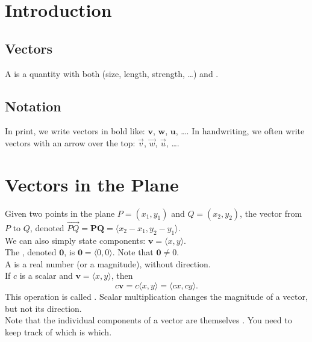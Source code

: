 \section{Introduction}

\subsection{Vectors}

A  is a quantity with both  (size, length, strength, \dots) and .  

\subsection{Notation}

In print, we write vectors in bold like: $\mathbf{v}$, $\mathbf{w}$, $\mathbf{u}$, \dots.  In handwriting, we often write vectors with an arrow over the top: $\vec{v}$, $\vec{w}$, $\vec{u}$, \dots.

\section{Vectors in the Plane}

Given two points in the plane \(P = (x_{1},y_{1})\) and \(Q = (x_{2},y_{2})\), the vector from \(P\) to \(Q\), denoted \(\overrightarrow{PQ} = \mathbf{PQ} = \langle x_{2}-x_{1},y_{2}-y_{1}\rangle\). \\

We can also simply state components: \(\mathbf{v} = \langle x, y\rangle\). \\

The , denoted \(\mathbf{0}\), is \(\mathbf{0} = \langle 0,0 \rangle\). Note that \(\mathbf{0} \ne 0\). \\

A  is a real number (or a magnitude), without direction. \\

If \(c\) is a scalar and \(\mathbf{v} = \langle x,y\rangle\), then
\[
    c\mathbf{v} = c\langle x,y\rangle = \langle cx,cy\rangle.
\]
This operation is called . Scalar multiplication changes the magnitude of a vector, but not its direction. \\

Note that the individual components of a vector are themselves . You need to keep track of which is which. \\


